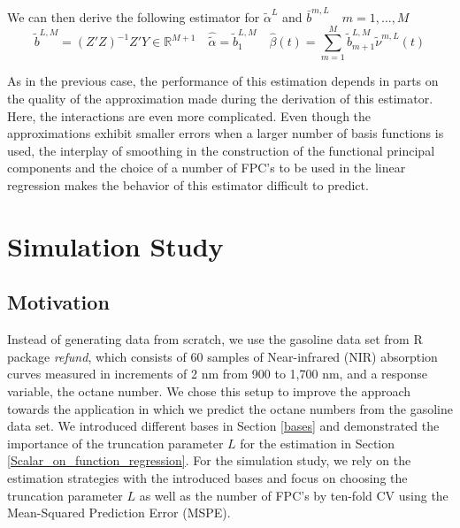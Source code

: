 \documentclass[11pt,twoside,a4paper]{article}
\begin{document}
	We can then derive the following estimator for $\tilde{\alpha}^L$ and $\bar{b}^{m,L} \quad m = 1, \dots, M$
	\begin{equation}
		\tilde{b}^{L,M} = \left(Z'Z\right)^{-1}Z'Y \in \mathbb{R}^{M+1} \quad \hat{\tilde{\alpha}} = \tilde{b}_{1}^{L,M} \quad \hat{\beta}(t) = \sum_{m = 1}^{M} \tilde{b}_{m + 1}^{L,M} \tilde{\nu}^{m,L}(t)
	\end{equation}

	As in the previous case, the performance of this estimation depends in parts on the quality of the approximation made during the derivation of this estimator. Here, the interactions are even more complicated. Even though the approximations exhibit smaller errors when a larger number of basis functions is used, the interplay of smoothing in the construction of the functional principal components and the choice of a number of FPC's to be used in the linear regression makes the behavior of this estimator difficult to predict. 

	\nocite{alexanderian_KLexpansion_2015}
	\nocite{kokoszka_introduction_2017}
	\nocite{hsing_theoretical_2015}
	\nocite{ramsay_functional_2005}
	\nocite{horvath_inference_2012}
	\nocite{cai_prediction_2006}
	\nocite{levitin_introduction_2007}

	\section{Simulation Study}\label{Simulation}

	\subsection{Motivation}\label{sim_motivation}
	
	Instead of generating data from scratch, we use the gasoline data set from R package \textit{refund}, which consists of 60 samples of Near-infrared (NIR) absorption curves measured in increments of 2 nm from 900 to 1,700 nm, and a response variable, the octane number. We chose this setup to improve the approach towards the application in which we predict the octane numbers from the gasoline data set.	
	We introduced different bases in Section \ref{bases} and demonstrated the importance of the truncation parameter $L$ for the estimation in Section \ref{Scalar_on_function_regression}. For the simulation study, we rely on the estimation strategies with the introduced bases and focus on choosing the truncation parameter $L$ as well as the number of FPC's by ten-fold CV using the Mean-Squared Prediction Error (MSPE).
	
\end{document}
